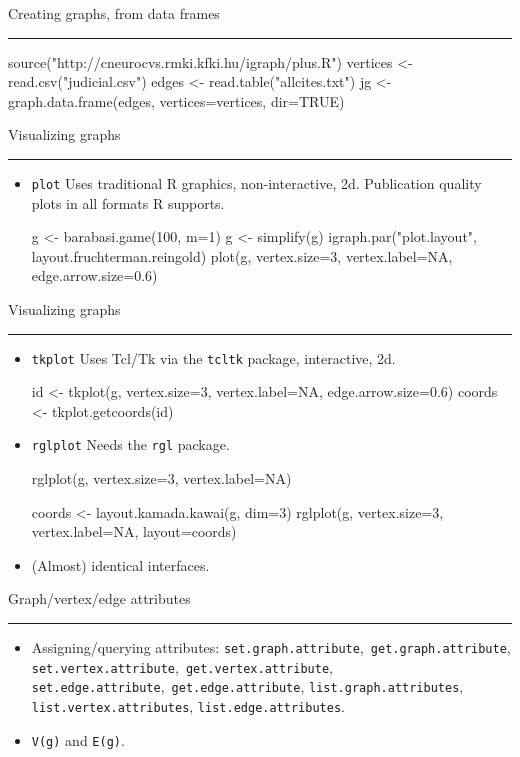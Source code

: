 \documentclass[landscape,fleqno]{foils}
\newcommand{\stitle}[1]{{\color{blue}\Large #1\par\vspace*{10pt}\hrule}}
\newenvironment{narrow}[2]{%
  \begin{list}{}{%
      \setlength{\topsep}{0pt}%
      \setlength{\leftmargin}{#1}%
      \setlength{\rightmargin}{#2}%
      \setlength{\listparindent}{\parindent}%
      \setlength{\itemindent}{\parindent}%
      \setlength{\parsep}{\parskip}}%
    \item[]}{\end{list}}
\begin{document}
\newpage
\stitle{Creating graphs, from data frames}

\begin{narrow}{0cm}{15cm}
\begin{Myverb}
  source("http://cneurocvs.rmki.kfki.hu/igraph/plus.R")
  vertices <- read.csv("judicial.csv")
  edges <- read.table("allcites.txt")
  jg <- graph.data.frame(edges, vertices=vertices, dir=TRUE)
\end{Myverb}
\end{narrow}

\newpage
\stitle{Visualizing graphs}
\begin{narrow}{0cm}{15cm}
\begin{itemize}
\item \verb+plot+ Uses traditional R graphics, non-interactive, 2d.
  Publication quality plots in all formats R supports. \pause
\begin{Myverb}
  g <- barabasi.game(100, m=1)
  g <- simplify(g)
  igraph.par("plot.layout", 
             layout.fruchterman.reingold)
  plot(g, vertex.size=3, vertex.label=NA, 
       edge.arrow.size=0.6)
\end{Myverb}
\end{itemize}
\end{narrow}

\newpage
\stitle{Visualizing graphs}
\begin{narrow}{0cm}{15cm}
\begin{itemize}
\item \verb+tkplot+ Uses Tcl/Tk via the \verb+tcltk+ package, 
  interactive, 2d. \pause
\begin{Myverb}
  id <- tkplot(g, vertex.size=3, vertex.label=NA, 
        edge.arrow.size=0.6)
  coords <- tkplot.getcoords(id)
\end{Myverb}
\pause
\item \verb+rglplot+ Needs the \verb+rgl+ package. \pause
\begin{Myverb}
  rglplot(g, vertex.size=3, vertex.label=NA)

  coords <- layout.kamada.kawai(g, dim=3)
  rglplot(g, vertex.size=3, vertex.label=NA, 
          layout=coords)
\end{Myverb}
\pause
\item (Almost) identical interfaces.
\end{itemize}
\end{narrow}

\newpage
\stitle{Graph/vertex/edge attributes}
\begin{narrow}{0cm}{15cm}
\begin{itemize}
\item Assigning/querying attributes:
  {\small
    \texttt{set.graph.attribute},~\texttt{get.graph.attribute},
    \texttt{set.vertex.attribute},~\texttt{get.vertex.attribute},  
    \texttt{set.edge.attribute},~\texttt{get.edge.attribute},
    \texttt{list.graph.attributes},
    \texttt{list.vertex.attributes},
    \texttt{list.edge.attributes}.
} \pause
\item \verb+V(g)+ and \verb+E(g)+. \pause
\end{itemize}
\end{narrow}
\end{document}
